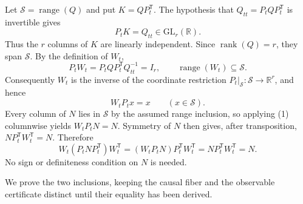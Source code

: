 Let \(\mathcal S=\operatorname{range}(Q)\) and put \(K=QP_t^{\mathsf T}\).  The hypothesis that \(Q_{tt}=P_tQP_t^{\mathsf T}\) is invertible gives
\[
 P_tK=Q_{tt}\in\mathrm{GL}_r(\mathbb R).
\]
Thus the \(r\) columns of \(K\) are linearly independent.  Since \(\operatorname{rank}(Q)=r\), they span \(\mathcal S\).  By the definition of \(W_t\),
\[
 P_tW_t=P_tQP_t^{\mathsf T}Q_{tt}^{-1}=I_r,
 \qquad \operatorname{range}(W_t)\subseteq\mathcal S.
\]
Consequently \(W_t\) is the inverse of the coordinate restriction \(P_t\vert_{\mathcal S}:\mathcal S\to\mathbb R^r\), and hence
\[
 W_tP_tx=x\qquad(x\in\mathcal S). \tag{1}
\]
Every column of \(N\) lies in \(\mathcal S\) by the assumed range inclusion, so applying (1) columnwise yields \(W_tP_tN=N\).  Symmetry of \(N\) then gives, after transposition, \(NP_t^{\mathsf T}W_t^{\mathsf T}=N\).  Therefore
\[
 W_t(P_tNP_t^{\mathsf T})W_t^{\mathsf T}
 =(W_tP_tN)P_t^{\mathsf T}W_t^{\mathsf T}
 =NP_t^{\mathsf T}W_t^{\mathsf T}=N.
\]
No sign or definiteness condition on \(N\) is needed.

We prove the two inclusions, keeping the causal fiber and the observable certificate distinct until their equality has been derived.

